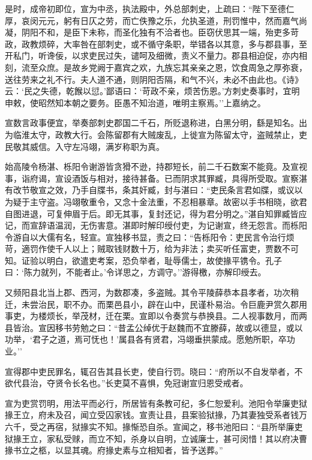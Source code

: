 \documentclass[]{article}
\begin{document}
是时，成帝初即位，宣为中丞，执法殿中，外总部刺史，上疏曰：``陛下至德仁厚，哀闵元元，躬有日仄之劳，而亡佚豫之乐，允执圣道，刑罚惟中，然而嘉气尚凝，阴阳不和，是臣下未称，而圣化独有不洽者也。臣窃伏思其一端，殆吏多苛政，政教烦碎，大率咎在部刺史，或不循守条职，举错各以其意，多与郡县事，至开私门，听谗佞，以求吏民过失，谴呵及细微，责义不量力。郡县相迫促，亦内相刻，流至众庶。是故乡党阙于嘉宾之欢，九族忘其亲亲之恩，饮食周急之厚弥衰，送往劳来之礼不行。夫人道不通，则阴阳否隔，和气不兴，未必不由此也。《诗》云：`民之失德，乾餱以愆。'鄙语曰：`苛政不亲，烦苦伤恩。'方刺史奏事时，宜明申敕，使昭然知本朝之要务。臣愚不知治道，唯明主察焉。''上嘉纳之。

宣数言政事便宜，举奏部刺史郡国二千石，所贬退称进，白黑分明，繇是知名。出为临淮太守，政教大行。会陈留郡有大贼废乱，上徙宣为陈留太守，盗贼禁止，吏民敬其威信。入守左冯翊，满岁称职为真。

始高陵令杨湛、栎阳令谢游皆贪猾不逊，持郡短长，前二千石数案不能竟。及宣视事，诣府谒，宣设酒饭与相对，接待甚备。已而阴求其罪臧，具得所受取。宣察湛有改节敬宣之效，乃手自牒书，条其奸臧，封与湛曰：``吏民条言君如牒，或议以为疑于主守盗。冯翊敬重令，又念十金法重，不忍相暴章。故密以手书相晓，欲君自图进退，可复伸眉于后。即无其事，复封还记，得为君分明之。''湛自知罪臧皆应记，而宣辞语温润，无伤害意。湛即时解印绶付吏，为记谢宣，终无怨言。而栎阳令游自以大儒有名，轻宣。宣独移书显，责之曰：``告栎阳令：吏民言令治行烦苛，適罚作使千人以上；贼取钱财数十万，给为非法；卖买听任富吏，贾数不可知。证验以明白，欲遣吏考案，恐负举者，耻辱儒士，故使掾平镌令。孔子曰：`陈力就列，不能者止。'令详思之，方调守。''游得檄，亦解印绶去。

又频阳县北当上郡、西河，为数郡凑，多盗贼。其令平陵薛恭本县孝者，功次稍迁，未尝治民，职不办。而栗邑县小，辟在山中，民谨朴易治。令巨鹿尹赏久郡用事吏，为楼烦长，举茂材，迁在栗。宣即以令奏赏与恭换县。二人视事数月，而两县皆治。宣因移书劳勉之曰：``昔孟公绰优于赵魏而不宜滕薛，故或以德显，或以功举，`君子之道，焉可怃也！'属县各有贤君，冯翊垂拱蒙成。愿勉所职，卒功业。''

宣得郡中吏民罪名，辄召告其县长吏，使自行罚。晓曰：``府所以不自发举者，不欲代县治，夺贤令长名也。''长吏莫不喜惧，免冠谢宣归恩受戒者。

宣为吏赏罚明，用法平而必行，所居皆有条教可纪，多仁恕爱利。池阳令举廉吏狱掾王立，府未及召，闻立受囚家钱。宣责让县，县案验狱掾，乃其妻独受系者钱万六千，受之再宿，狱掾实不知。掾惭恐自杀。宣闻之，移书池阳曰：``县所举廉吏狱掾王立，家私受赇，而立不知，杀身以自明，立诚廉士，甚可闵惜！其以府决曹掾书立之柩，以显其魂。府掾史素与立相知者，皆予送葬。''
\end{document}
